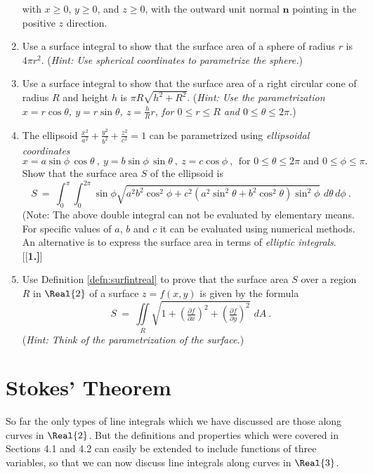 \begin{multicols}{2}
\begin{enumerate}[\bfseries 1.]
  with $x \ge 0$, $y \ge 0$, and $z \ge 0$, with the outward unit normal $\textbf{n}$ pointing in the positive $z$
  direction.
 \item Use a surface integral to show that the surface area of a sphere of radius $r$ is $4\pi r^2$. (\emph{Hint: Use
  spherical coordinates to parametrize the sphere.})
 \item Use a surface integral to show that the surface area of a right circular cone of radius $R$ and height $h$ is
  $\pi R \sqrt{h^2 + R^2}$. (\emph{Hint: Use the parametrization $x=r\cos\theta$, $y=r\sin\theta$, $z=\frac{h}{R}r$,
  for $0 \le r \le R$ and $0 \le \theta \le 2\pi$.})
 \item The ellipsoid $\frac{x^2}{a^2}+\frac{y^2}{b^2}+\frac{z^2}{c^2}=1$ can be parametrized using
 \emph{ellipsoidal coordinates}
 \begin{displaymath}
  x=a\sin\phi\,\cos\theta ~, ~y=b\sin\phi\,\sin\theta ~, ~z=c\cos\phi~, ~~\text{for $0 \le \theta \le 2\pi$ and
  $0 \le \phi \le \pi$.}
 \end{displaymath}
 Show that the surface area $S$ of the ellipsoid is
 \begin{displaymath}
  S ~=~ \int_0^{\pi} \int_0^{2\pi} \sin\phi \sqrt{a^2 b^2 \cos^2 \phi + c^2 (a^2 \sin^2 \theta + b^2 \cos^2 \theta )
  \sin^2 \phi} \,\,d\theta\,d\phi~.
 \end{displaymath}
 (Note: The above double integral can not be evaluated by elementary means. For specific values of $a$, $b$ and
 $c$ it can be evaluated using numerical methods. An alternative is to express the surface area in terms of
 \emph{elliptic integrals}.
[{[\bfseries 1.]}]
 \item Use Definition \ref{defn:surfintreal} to prove that the surface area $S$ over a region $R$ in $\Real{2}$
  of a surface $z=f(x,y)$ is given by the formula
  \begin{displaymath}
   S ~=~ \iint\limits_R \sqrt{1 + \left( \tfrac{\partial f}{\partial x} \right)^2 +
   \left( \tfrac{\partial f}{\partial y} \right)^2} \,\,dA ~.
  \end{displaymath}
  (\emph{Hint: Think of the parametrization of the surface.})
\end{enumerate}
\end{multicols}

\section{Stokes' Theorem}
So far the only types of line integrals which we have discussed are those along curves in $\Real{2}$. But the
definitions and properties which were covered in Sections 4.1 and 4.2 can easily be extended to include
functions of three variables, so that we can now discuss line integrals along curves in $\Real{3}$.

